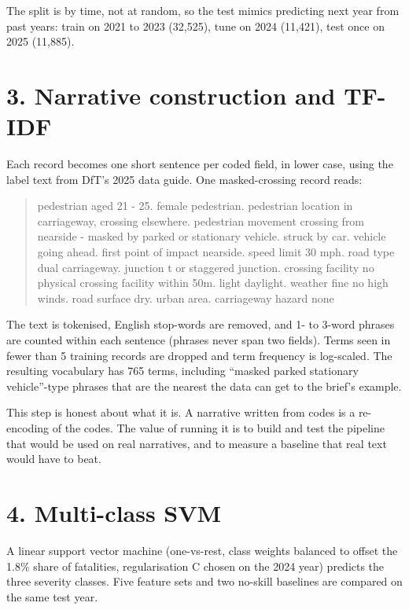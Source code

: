 \documentclass[10pt,a4paper]{article}
\begin{document}
The split is by time, not at random, so the test mimics predicting next year from past years: train on 2021 to 2023 (32,525), tune on 2024 (11,421), test once on 2025 (11,885).\par

\section*{3. Narrative construction and TF-IDF}

Each record becomes one short sentence per coded field, in lower case, using the label text from DfT's 2025 data guide. One masked-crossing record reads:\par

\begin{quote}\small\ttfamily\raggedright pedestrian aged 21 - 25. female pedestrian. pedestrian location in carriageway, crossing elsewhere. pedestrian movement crossing from nearside - masked by parked or stationary vehicle. struck by car. vehicle going ahead. first point of impact nearside. speed limit 30 mph. road type dual carriageway. junction t or staggered junction. crossing facility no physical crossing facility within 50m. light daylight. weather fine no high winds. road surface dry. urban area. carriageway hazard none\end{quote}

The text is tokenised, English stop-words are removed, and 1- to 3-word phrases are counted within each sentence (phrases never span two fields). Terms seen in fewer than 5 training records are dropped and term frequency is log-scaled. The resulting vocabulary has 765 terms, including ``masked parked stationary vehicle''-type phrases that are the nearest the data can get to the brief's example.\par

This step is honest about what it is. A narrative written from codes is a re-encoding of the codes. The value of running it is to build and test the pipeline that would be used on real narratives, and to measure a baseline that real text would have to beat.\par

\section*{4. Multi-class SVM}

A linear support vector machine (one-vs-rest, class weights balanced to offset the 1.8\% share of fatalities, regularisation C chosen on the 2024 year) predicts the three severity classes. Five feature sets and two no-skill baselines are compared on the same test year.\par
\end{document}
